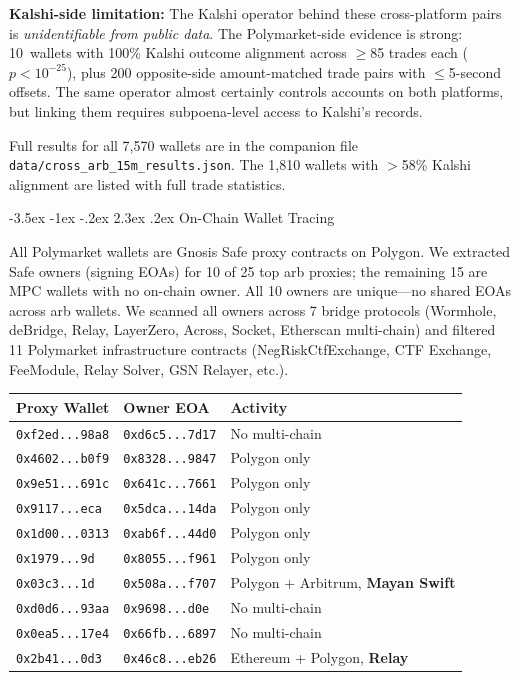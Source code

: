 \documentclass[11pt,a4paper]{article}
\makeatletter
\renewcommand\section{\@startsection{section}{1}{\z@}%
  {-3.5ex \@plus -1ex \@minus -.2ex}%
  {2.3ex \@plus .2ex}%
  {\normalfont\Large\bfseries}}
\makeatother
\begin{document}
\textbf{Kalshi-side limitation:} The Kalshi operator behind these cross-platform pairs is \textit{unidentifiable from public data}. The Polymarket-side evidence is strong: 10~wallets with 100\% Kalshi outcome alignment across $\geq$85 trades each ($p < 10^{-25}$), plus 200 opposite-side amount-matched trade pairs with $\leq$5-second offsets. The same operator almost certainly controls accounts on both platforms, but linking them requires subpoena-level access to Kalshi's records.

Full results for all 7,570 wallets are in the companion file \texttt{data/cross\_arb\_15m\_\allowbreak{}results.json}. The 1,810 wallets with $>$58\% Kalshi alignment are listed with full trade statistics.

\section{On-Chain Wallet Tracing}
\label{app:onchain}

All Polymarket wallets are Gnosis Safe proxy contracts on Polygon. We extracted Safe owners (signing EOAs) for 10 of 25 top arb proxies; the remaining 15 are MPC wallets with no on-chain owner. All 10 owners are unique---no shared EOAs across arb wallets. We scanned all owners across 7 bridge protocols (Wormhole, deBridge, Relay, LayerZero, Across, Socket, Etherscan multi-chain) and filtered 11 Polymarket infrastructure contracts (NegRiskCtfExchange, CTF Exchange, FeeModule, Relay Solver, GSN Relayer, etc.).

\footnotesize
\begin{longtable}{@{}lll@{}}
\toprule
\textbf{Proxy Wallet} & \textbf{Owner EOA} & \textbf{Activity} \\
\midrule
\endhead
\texttt{0xf2ed...98a8} & \texttt{0xd6c5...7d17} & No multi-chain \\
\texttt{0x4602...b0f9} & \texttt{0x8328...9847} & Polygon only \\
\texttt{0x9e51...691c} & \texttt{0x641c...7661} & Polygon only \\
\texttt{0x9117...eca} & \texttt{0x5dca...14da} & Polygon only \\
\texttt{0x1d00...0313} & \texttt{0xab6f...44d0} & Polygon only \\
\texttt{0x1979...9d} & \texttt{0x8055...f961} & Polygon only \\
\texttt{0x03c3...1d} & \texttt{0x508a...f707} & Polygon + Arbitrum, \textbf{Mayan Swift} \\
\texttt{0xd0d6...93aa} & \texttt{0x9698...d0e} & No multi-chain \\
\texttt{0x0ea5...17e4} & \texttt{0x66fb...6897} & No multi-chain \\
\texttt{0x2b41...0d3} & \texttt{0x46c8...eb26} & Ethereum + Polygon, \textbf{Relay} \\
\bottomrule
\end{longtable}
\normalsize
\end{document}
